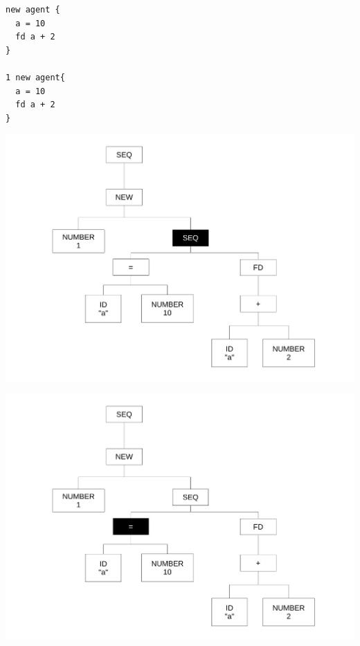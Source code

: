 \begin{frame}[fragile]
	\begin{lstlisting}[language=Stibbons]
new agent {
  a = 10
  fd a + 2
}

1 new agent{
  a = 10
  fd a + 2
}
	\end{lstlisting}
\end{frame}

\begin{frame}
\includegraphics[scale=0.3]{doc/Presentation/img/arbre4.pdf}
\end{frame}

\begin{frame}
\includegraphics[scale=0.3]{doc/Presentation/img/arbre5.pdf}
\end{frame}

